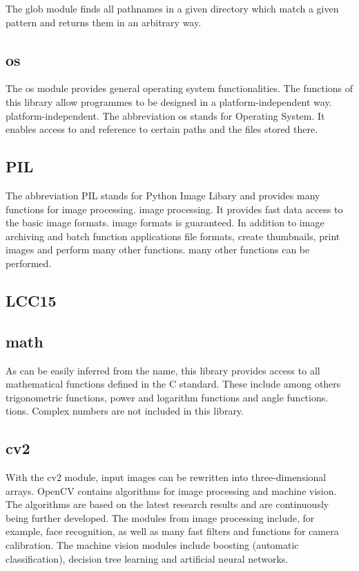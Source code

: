 The glob module finds all pathnames in a given directory which match a
given pattern and returns them in an arbitrary way. \cite{Python:2020}

\subsection{os}

The os module provides general operating system functionalities. 
The functions of this library allow programmes to be designed in a platform-independent way.
platform-independent. The abbreviation os stands for Operating System. It enables access to and
reference to certain paths and the files stored there. \cite{Balakreshnan:2019}

\subsection{PIL}

The abbreviation PIL stands for Python Image Libary and provides many functions for image processing.
image processing. It provides fast data access to the basic image formats.
image formats is guaranteed. In addition to image archiving and batch function applications
file formats, create thumbnails, print images and perform many other functions.
many other functions can be performed. \subsection{LCC15}

\subsection{math}

As can be easily inferred from the name, this library provides access to
all mathematical functions defined in the C standard. These include among others
trigonometric functions, power and logarithm functions and angle functions.
tions. Complex numbers are not included in this library. \cite{Python:2020c}


\subsection{cv2}

With the cv2 module, input images can be rewritten into three-dimensional arrays. OpenCV contains algorithms for image processing and machine vision. The algorithms are based on the latest research results and are continuously being further developed. The modules from image processing include, for example, face recognition, as well as many fast filters and functions for camera calibration.
The machine vision modules include boosting (automatic classification),
decision tree learning and artificial neural networks. \cite{OpenCV:2020}


